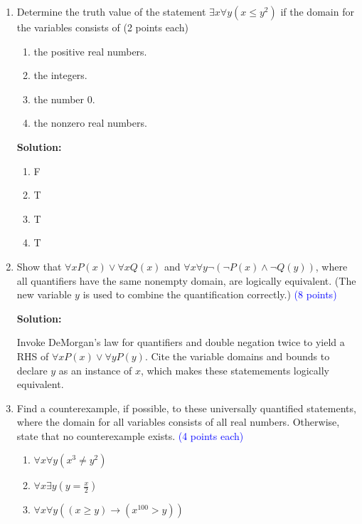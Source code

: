 \documentclass{article}
\newcommand{\pt}[1]{\textcolor{blue}{(#1 points)}}
\newcommand{\pte}[1]{\textcolor{blue}{(#1 points each)}}
\newenvironment{solution}
{
\par
\color{blue}
\textbf{Solution:}
}
{
\par
}
\begin{document}
\begin{enumerate}
    \item{Determine the truth value of the statement $\exists x \forall y (x \leq y^{2})$ if the domain for the variables consists of \hfill \color{blue}(2 points each)}\
    \begin{enumerate}
    \item the positive real numbers.
    \item the integers.
    \item the number 0.
    \item the nonzero real numbers.
    \end{enumerate}
    
    \vspace{2mm}
    \begin{solution}
    \begin{enumerate}
        \item F
        \item T
        \item T
        \item T
    \end{enumerate}
    \end{solution}
    
    \item{Show that $\forall x P(x) \lor \forall x Q(x)$ and $\forall x \forall y \neg(\neg P(x) \land \neg Q(y))$, where all quantifiers have the same nonempty domain, are logically equivalent. (The new variable $y$ is used to combine the quantification correctly.)} \pt 8

    \vspace{2mm}
    \begin{solution}
    Invoke DeMorgan's law for quantifiers and double negation twice to yield a RHS of $\forall x P(x) \lor \forall y P(y)$. Cite the variable domains and bounds to declare $y$ as an instance of $x$, which makes these statemements logically equivalent.
    \end{solution}
    
    \item{ Find a counterexample, if possible, to these universally quantified statements, where the domain for all variables consists of all real numbers. Otherwise, state that no counterexample exists. } \pte 4
    \begin{enumerate}
        \item $\forall x \forall y (x^3 \neq y^2)$
        \item $\forall x \exists y (y = \frac{x}{2})$
        \item $\forall x \forall y ((x \geq y) \rightarrow (x^{100} > y))$
    \end{enumerate}
    

\end{enumerate}
\end{document}
